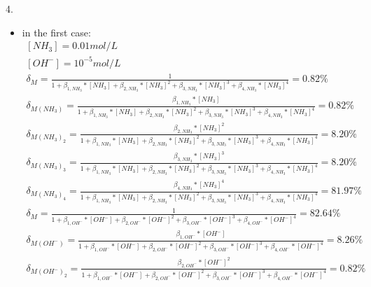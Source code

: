\documentclass{article}
\begin{document}
4.\begin{itemize}
    \item in the first case:\\
\begin{equation}
    \begin{multlined}
        \left[NH_3\right] = 0.01 mol/L\\
        \left[OH^-\right] = 10^{-5} mol/L\\
        \delta_{M} = \frac{1}{1 + \beta_{1, NH_3}*\left[NH_3\right] + \beta_{2, NH_3}*\left[NH_3\right]^2 + \beta_{3, NH_3}*\left[NH_3\right]^3 + \beta_{4, NH_3}*\left[NH_3\right]^4} = 0.82\%\\
        \delta_{M\left(NH_3\right)} = \frac{\beta_{1, NH_3}*\left[NH_3\right]}{1 + \beta_{1, NH_3}*\left[NH_3\right] + \beta_{2, NH_3}*\left[NH_3\right]^2 + \beta_{3, NH_3}*\left[NH_3\right]^3 + \beta_{4, NH_3}*\left[NH_3\right]^4} = 0.82\%\\
        \delta_{M\left(NH_3\right)_2} = \frac{\beta_{2, NH_3}*\left[NH_3\right]^2}{1 + \beta_{1, NH_3}*\left[NH_3\right] + \beta_{2, NH_3}*\left[NH_3\right]^2 + \beta_{3, NH_3}*\left[NH_3\right]^3 + \beta_{4, NH_3}*\left[NH_3\right]^4} = 8.20\%\\
        \delta_{M\left(NH_3\right)_3} = \frac{\beta_{3, NH_3}*\left[NH_3\right]^3}{1 + \beta_{1, NH_3}*\left[NH_3\right] + \beta_{2, NH_3}*\left[NH_3\right]^2 + \beta_{3, NH_3}*\left[NH_3\right]^3 + \beta_{4, NH_3}*\left[NH_3\right]^4} = 8.20\%\\
        \delta_{M\left(NH_3\right)_4} = \frac{\beta_{4, NH_3}*\left[NH_3\right]^4}{1 + \beta_{1, NH_3}*\left[NH_3\right] + \beta_{2, NH_3}*\left[NH_3\right]^2 + \beta_{3, NH_3}*\left[NH_3\right]^3 + \beta_{4, NH_3}*\left[NH_3\right]^4} = 81.97\%\\
        \delta_{M} = \frac{1}{1 + \beta_{1, OH^-}*\left[OH^-\right] + \beta_{2, OH^-}*\left[OH^-\right]^2 + \beta_{3, OH^-}*\left[OH^-\right]^3 + \beta_{4, OH^-}*\left[OH^-\right]^4} = 82.64\%\\
        \delta_{M\left(OH^-\right)} = \frac{\beta_{1, OH^-}*\left[OH^-\right]}{1 + \beta_{1, OH^-}*\left[OH^-\right] + \beta_{2, OH^-}*\left[OH^-\right]^2 + \beta_{3, OH^-}*\left[OH^-\right]^3 + \beta_{4, OH^-}*\left[OH^-\right]^4} = 8.26\%\\
        \delta_{M\left(OH^-\right)_2} = \frac{\beta_{2, OH^-}*\left[OH^-\right]^2}{1 + \beta_{1, OH^-}*\left[OH^-\right] + \beta_{2, OH^-}*\left[OH^-\right]^2 + \beta_{3, OH^-}*\left[OH^-\right]^3 + \beta_{4, OH^-}*\left[OH^-\right]^4} = 0.82\%\\

\end{multlined}
\end{equation}
\end{itemize}
\end{document}

